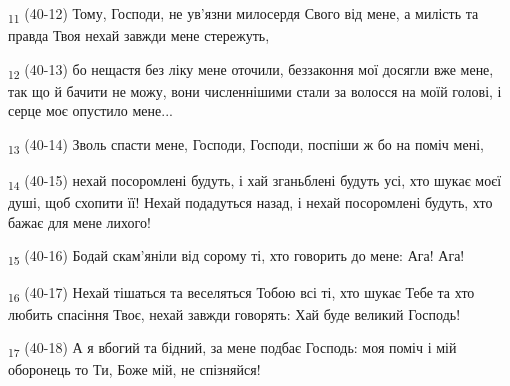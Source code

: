 \begin{tcolorbox}
\textsubscript{11} (40-12) Тому, Господи, не ув'язни милосердя Свого від мене, а милість та правда Твоя нехай завжди мене стережуть,
\end{tcolorbox}
\begin{tcolorbox}
\textsubscript{12} (40-13) бо нещастя без ліку мене оточили, беззаконня мої досягли вже мене, так що й бачити не можу, вони численнішими стали за волосся на моїй голові, і серце моє опустило мене...
\end{tcolorbox}
\begin{tcolorbox}
\textsubscript{13} (40-14) Зволь спасти мене, Господи, Господи, поспіши ж бо на поміч мені,
\end{tcolorbox}
\begin{tcolorbox}
\textsubscript{14} (40-15) нехай посоромлені будуть, і хай зганьблені будуть усі, хто шукає моєї душі, щоб схопити її! Нехай подадуться назад, і нехай посоромлені будуть, хто бажає для мене лихого!
\end{tcolorbox}
\begin{tcolorbox}
\textsubscript{15} (40-16) Бодай скам'яніли від сорому ті, хто говорить до мене: Ага! Ага!
\end{tcolorbox}
\begin{tcolorbox}
\textsubscript{16} (40-17) Нехай тішаться та веселяться Тобою всі ті, хто шукає Тебе та хто любить спасіння Твоє, нехай завжди говорять: Хай буде великий Господь!
\end{tcolorbox}
\begin{tcolorbox}
\textsubscript{17} (40-18) А я вбогий та бідний, за мене подбає Господь: моя поміч і мій оборонець то Ти, Боже мій, не спізняйся!
\end{tcolorbox}
